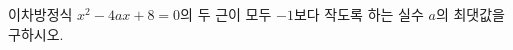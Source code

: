 \hspace*{2mm}\begin{minipage}[t]{\dimexpr\linewidth-2mm\relax}\vspace{0pt}
이차방정식 $x^2-4ax+8=0$의 두 근이 모두 $-1$보다 작도록 하는 실수 $a$의 최댓값을 구하시오.\end{minipage}
